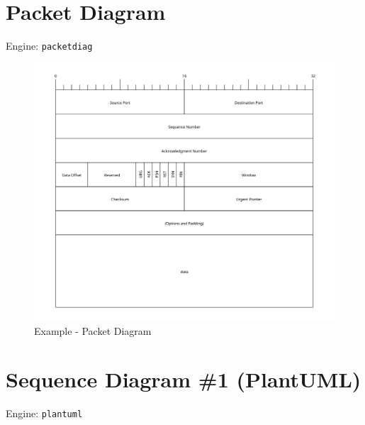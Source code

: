 \documentclass[
  12pt,
  a4paper,
  12pt,
  oneside,
  openany]{book}
\begin{document}
\newpage

\hypertarget{kroki-packet}{%
\section{Packet Diagram}\label{kroki-packet}}

Engine: \texttt{packetdiag}

\begin{figure}

{\centering \includegraphics{generated/diagrams-examples-packetdiag-Rmd} 

}

\caption{Example - Packet Diagram}\label{fig:examples-packet}
\end{figure}

\newpage

\hypertarget{kroki-pumlSequence}{%
\section{Sequence Diagram \#1 (PlantUML)}\label{kroki-pumlSequence}}

Engine: \texttt{plantuml}
\end{document}
